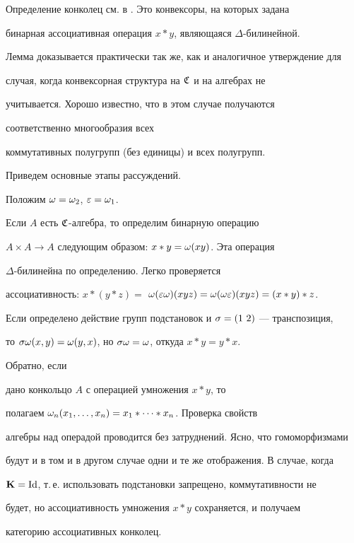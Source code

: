 \begin{pf}


Определение конколец см. в \cite{Sc2}. Это конвексоры, на которых задана


бинарная ассоциативная операция $x*y$, являющаяся $\Delta$-билинейной.


Лемма доказывается практически так же, как и аналогичное утверждение для


случая, когда конвексорная структура на $\frak C$ и на алгебрах не


учитывается. Хорошо известно, что в этом случае получаются


соответственно многообразия всех


коммутативных полугрупп (без единицы) и всех полугрупп.


Приведем основные этапы рассуждений.


Положим $\omega=\omega_2$, $\varepsilon=\omega_1$.


Если $A$ есть $\frak C$-алгебра, то определим бинарную операцию


$A\times A\to A$ следующим образом: $x*y=\omega (xy)$. Эта операция


$\Delta$-билинейна по определению. Легко проверяется


ассоциативность: $x*(y*z)=$ $\omega(\varepsilon\omega)(xyz)=\omega(\omega\varepsilon)(xyz)=(x*y)*z$.


Если определено действие групп подстановок и $\sigma=(1\ 2)$ --- транспозиция,


то $\sigma\omega (x,y)=\omega(y,x)$, но $\sigma\omega=\omega$, откуда $x*y=y*x$.





Обратно, если


дано конкольцо $A$ с операцией умножения $x*y$, то


полагаем $\omega_n(x_1,\dotsc,x_n)=x_1*\dotsb *x_n$. Проверка свойств


алгебры над операдой проводится без затруднений. Ясно, что гомоморфизмами


будут и в том и в другом случае одни и те же отображения. В случае, когда


$\bold K=\operatorname{Id}$, т.\,е. использовать подстановки запрещено, коммутативности не


будет, но ассоциативность умножения $x*y$ сохраняется, и получаем


категорию ассоциативных конколец.


\end{pf}








